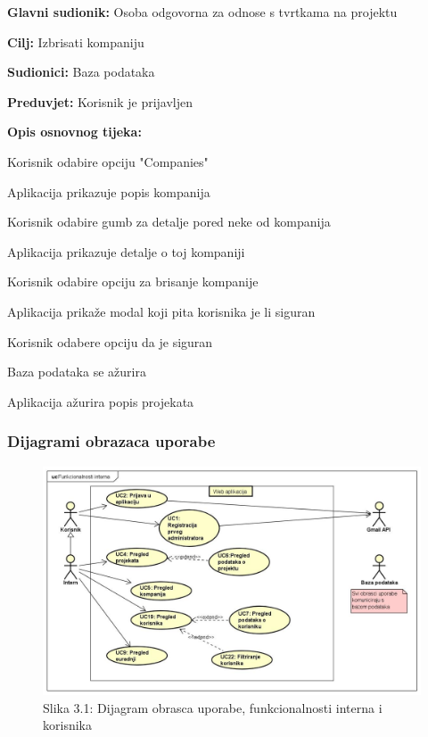 					\noindent {}
					\begin{packed_item}

						\item \textbf{Glavni sudionik:} Osoba odgovorna za odnose s tvrtkama na projektu
						\item \textbf{Cilj:} Izbrisati kompaniju
						\item \textbf{Sudionici:} Baza podataka
						\item \textbf{Preduvjet:} Korisnik je prijavljen
						\item \textbf{Opis osnovnog tijeka:}

						\item[] \begin{packed_enum}

							\item Korisnik odabire opciju "Companies"
							\item Aplikacija prikazuje popis kompanija
							\item Korisnik odabire gumb za detalje pored neke od kompanija
							\item Aplikacija prikazuje detalje o toj kompaniji
							\item Korisnik odabire opciju za brisanje kompanije
							\item Aplikacija prikaže modal koji pita korisnika je li siguran
							\item Korisnik odabere opciju da je siguran
							\item Baza podataka se ažurira
							\item Aplikacija ažurira popis projekata

						\end{packed_enum}

					\end{packed_item}
					
				\subsubsection{Dijagrami obrazaca uporabe}

					\begin{figure}[H]
						\includegraphics[scale=0.4]{slike/UC dijagrami/UseCase observer}
						\centering
						\caption{Slika 3.1: Dijagram obrasca uporabe, funkcionalnosti interna i korisnika}
						\label{fig:observer}
					\end{figure}

